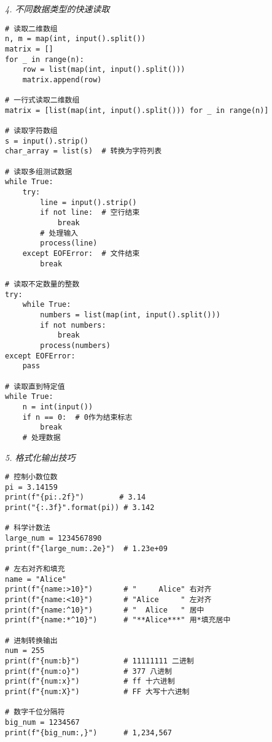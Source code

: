 \documentclass[a4paper,9pt,twocolumn]{ctexart}
\begin{document}
\textit{4. 不同数据类型的快速读取}
\begin{verbatim}
# 读取二维数组
n, m = map(int, input().split())
matrix = []
for _ in range(n):
    row = list(map(int, input().split()))
    matrix.append(row)

# 一行式读取二维数组
matrix = [list(map(int, input().split())) for _ in range(n)]

# 读取字符数组
s = input().strip()
char_array = list(s)  # 转换为字符列表

# 读取多组测试数据
while True:
    try:
        line = input().strip()
        if not line:  # 空行结束
            break
        # 处理输入
        process(line)
    except EOFError:  # 文件结束
        break

# 读取不定数量的整数
try:
    while True:
        numbers = list(map(int, input().split()))
        if not numbers:
            break
        process(numbers)
except EOFError:
    pass

# 读取直到特定值
while True:
    n = int(input())
    if n == 0:  # 0作为结束标志
        break
    # 处理数据
\end{verbatim}

\textit{5. 格式化输出技巧}
\begin{verbatim}
# 控制小数位数
pi = 3.14159
print(f"{pi:.2f}")        # 3.14
print("{:.3f}".format(pi)) # 3.142

# 科学计数法
large_num = 1234567890
print(f"{large_num:.2e}")  # 1.23e+09

# 左右对齐和填充
name = "Alice"
print(f"{name:>10}")       # "     Alice" 右对齐
print(f"{name:<10}")       # "Alice     " 左对齐  
print(f"{name:^10}")       # "  Alice   " 居中
print(f"{name:*^10}")      # "**Alice***" 用*填充居中

# 进制转换输出
num = 255
print(f"{num:b}")          # 11111111 二进制
print(f"{num:o}")          # 377 八进制
print(f"{num:x}")          # ff 十六进制
print(f"{num:X}")          # FF 大写十六进制

# 数字千位分隔符
big_num = 1234567
print(f"{big_num:,}")      # 1,234,567
\end{verbatim}
\end{document}
